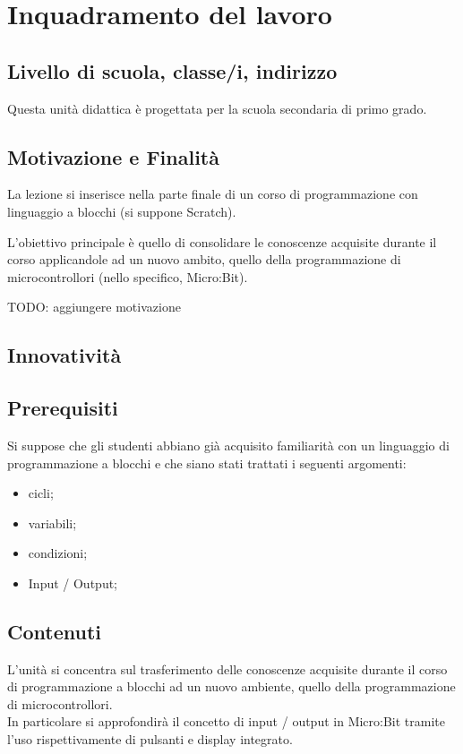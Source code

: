 \documentclass[../../relazione.tex]{subfiles}
\begin{document}
\section{Inquadramento del lavoro}

\subsection{Livello di scuola, classe/i, indirizzo}
Questa unità didattica è progettata per la scuola secondaria di primo grado.

\subsection{Motivazione e Finalità}
La lezione si inserisce nella parte finale di un corso di programmazione con linguaggio a blocchi (si suppone Scratch).

L'obiettivo principale è quello di consolidare le conoscenze acquisite durante il corso applicandole ad un nuovo ambito, quello della programmazione di microcontrollori (nello specifico, Micro:Bit).

TODO: aggiungere motivazione

\subsection{Innovatività}

\subsection{Prerequisiti}
Si suppose che gli studenti abbiano già acquisito familiarità con un linguaggio di programmazione a blocchi e che siano stati trattati i seguenti argomenti:
\begin{itemize}
	\item cicli;
	\item variabili;
	\item condizioni;
	\item Input / Output;
\end{itemize}

\subsection{Contenuti}
L'unità si concentra sul trasferimento delle conoscenze acquisite durante il corso di programmazione a blocchi ad un nuovo ambiente, quello della programmazione di microcontrollori.\\
In particolare si approfondirà il concetto di input / output in Micro:Bit tramite l'uso rispettivamente di pulsanti e display integrato. 
\end{document}
